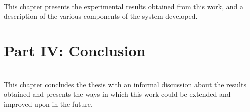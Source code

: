   \vspace{1mm}\\
\noindent This chapter presents the experimental results obtained from this work, and a description of the various components of the system developed.\\

\section*{Part IV: Conclusion}
  \vspace{1mm}\\
\noindent This chapter concludes the thesis with an informal discussion about the results obtained and presents the ways in which this work could be extended and improved upon in the future.\\
